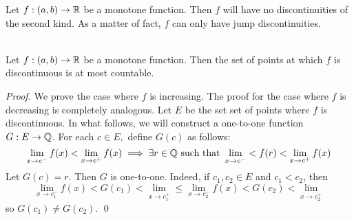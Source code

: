 \begin{corollary}
    Let $f: (a,b) \to \mathbb{R}$ be a monotone function. Then $f$ will have no discontinuities of the second kind. As a matter of fact, $f$ can only have jump discontinuities.
\end{corollary}

\begin{theorem} \leavevmode\\
    \label{Thm4.30}
    Let $f: (a,b) \to \mathbb{R}$ be a monotone function. Then the set of points at which $f$ is discontinuous is at most countable.
\end{theorem}

\begin{proof}
    We prove the case where $f$ is increasing. The proof for the case where $f$ is decreasing is completely analogous. Let $E$ be the set set of points where $f$ is discontinuous. In what follows, we will construct a one-to-one function $G: E \to \mathbb{Q}$. For each $c\in E,$ define $G(c)$ as follows:
    $$
    \lim \limits_{x \to c^-} f(x) < \lim \limits_{x \to c^+} f(x) \implies \exists r \in \mathbb{Q} \text{ such that } \lim \limits_{x \to c^-} < f(r) < \lim \limits_{x \to c^+} f(x)
    $$
    Let $G(c) = r.$ Then $G$ is one-to-one. Indeed, if $c_1, c_2 \in E$ and $c_1 < c_2$, then 
    $$
    \lim \limits_{x \to c_1^-}f(x) < G(c_1) < \lim \limits_{x \to c_1^+} \leq \lim \limits_{x \to c_2^-} f(x) < G(c_2) < \lim \limits_{x \to c_2^+}
    $$
    so $G(c_1) \not = G(c_2)$. \qed
\end{proof}